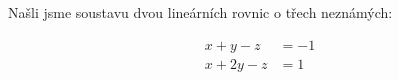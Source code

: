 \documentclass[12pt]{article}
\begin{document}
\begin{enumerate}
\begin{enumerate}
            Našli jsme soustavu dvou lineárních rovnic o třech neznámých:

            \begin{align*}
              x+y-z &= -1\\
              x+2y-z &= 1
            \end{align*}
    \end{enumerate}
\end{enumerate}
\end{document}
